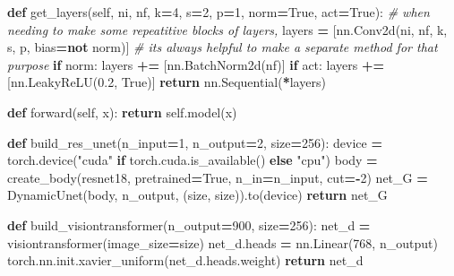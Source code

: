 \documentclass[
]{article}
\newenvironment{Shaded}{\begin{snugshade}}{\end{snugshade}}
\newcommand{\CommentTok}[1]{\textcolor[rgb]{0.56,0.35,0.01}{\textit{#1}}}
\newcommand{\ControlFlowTok}[1]{\textcolor[rgb]{0.13,0.29,0.53}{\textbf{#1}}}
\newcommand{\DecValTok}[1]{\textcolor[rgb]{0.00,0.00,0.81}{#1}}
\newcommand{\FloatTok}[1]{\textcolor[rgb]{0.00,0.00,0.81}{#1}}
\newcommand{\KeywordTok}[1]{\textcolor[rgb]{0.13,0.29,0.53}{\textbf{#1}}}
\newcommand{\NormalTok}[1]{#1}
\newcommand{\OperatorTok}[1]{\textcolor[rgb]{0.81,0.36,0.00}{\textbf{#1}}}
\newcommand{\StringTok}[1]{\textcolor[rgb]{0.31,0.60,0.02}{#1}}
\newcommand{\VariableTok}[1]{\textcolor[rgb]{0.00,0.00,0.00}{#1}}
\begin{document}
\begin{Shaded}
\begin{Highlighting}[]
    \KeywordTok{def}\NormalTok{ get\_layers(}\VariableTok{self}\NormalTok{, ni, nf, k}\OperatorTok{=}\DecValTok{4}\NormalTok{, s}\OperatorTok{=}\DecValTok{2}\NormalTok{, p}\OperatorTok{=}\DecValTok{1}\NormalTok{, norm}\OperatorTok{=}\VariableTok{True}\NormalTok{, act}\OperatorTok{=}\VariableTok{True}\NormalTok{): }\CommentTok{\# when needing to make some repeatitive blocks of layers,}
\NormalTok{        layers }\OperatorTok{=}\NormalTok{ [nn.Conv2d(ni, nf, k, s, p, bias}\OperatorTok{=}\KeywordTok{not}\NormalTok{ norm)]          }\CommentTok{\# it\textquotesingle{}s always helpful to make a separate method for that purpose}
        \ControlFlowTok{if}\NormalTok{ norm: layers }\OperatorTok{+=}\NormalTok{ [nn.BatchNorm2d(nf)]}
        \ControlFlowTok{if}\NormalTok{ act: layers }\OperatorTok{+=}\NormalTok{ [nn.LeakyReLU(}\FloatTok{0.2}\NormalTok{, }\VariableTok{True}\NormalTok{)]}
        \ControlFlowTok{return}\NormalTok{ nn.Sequential(}\OperatorTok{*}\NormalTok{layers)}
    
    \KeywordTok{def}\NormalTok{ forward(}\VariableTok{self}\NormalTok{, x):}
        \ControlFlowTok{return} \VariableTok{self}\NormalTok{.model(x)}
\end{Highlighting}
\end{Shaded}

\begin{Shaded}
\begin{Highlighting}[]
\KeywordTok{def}\NormalTok{ build\_res\_unet(n\_input}\OperatorTok{=}\DecValTok{1}\NormalTok{, n\_output}\OperatorTok{=}\DecValTok{2}\NormalTok{, size}\OperatorTok{=}\DecValTok{256}\NormalTok{):}
\NormalTok{    device }\OperatorTok{=}\NormalTok{ torch.device(}\StringTok{"cuda"} \ControlFlowTok{if}\NormalTok{ torch.cuda.is\_available() }\ControlFlowTok{else} \StringTok{"cpu"}\NormalTok{)}
\NormalTok{    body }\OperatorTok{=}\NormalTok{ create\_body(resnet18, pretrained}\OperatorTok{=}\VariableTok{True}\NormalTok{, n\_in}\OperatorTok{=}\NormalTok{n\_input, cut}\OperatorTok{={-}}\DecValTok{2}\NormalTok{)}
\NormalTok{    net\_G }\OperatorTok{=}\NormalTok{ DynamicUnet(body, n\_output, (size, size)).to(device)}
    \ControlFlowTok{return}\NormalTok{ net\_G}
\end{Highlighting}
\end{Shaded}

\begin{Shaded}
\begin{Highlighting}[]
\KeywordTok{def}\NormalTok{ build\_visiontransformer(n\_output}\OperatorTok{=}\DecValTok{900}\NormalTok{, size}\OperatorTok{=}\DecValTok{256}\NormalTok{):}
\NormalTok{    net\_d }\OperatorTok{=}\NormalTok{ visiontransformer(image\_size}\OperatorTok{=}\NormalTok{size)}
\NormalTok{    net\_d.heads }\OperatorTok{=}\NormalTok{ nn.Linear(}\DecValTok{768}\NormalTok{, n\_output)}
\NormalTok{    torch.nn.init.xavier\_uniform(net\_d.heads.weight)}
    \ControlFlowTok{return}\NormalTok{ net\_d}
\end{Highlighting}
\end{Shaded}
\end{document}
